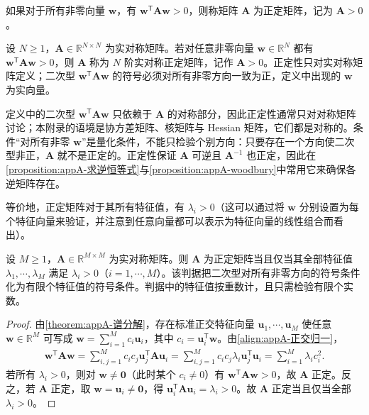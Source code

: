 \documentclass[../main.tex]{subfiles}
\begin{document}
如果对于所有非零向量 $\bm{w}$，有 $\bm{w}^{\mathsf{T}}\bm{A}\bm{w}>0$，则称矩阵 $\bm{A}$ 为正定矩阵，记为 $\bm{A}>0$。

\begin{definition}[正定矩阵]\label{definition:appA-正定矩阵}
设 $N\geqslant1$，$\bm{A}\in\mathbb{R}^{N\times N}$ 为实对称矩阵。若对任意非零向量 $\bm{w}\in\mathbb{R}^{N}$ 都有 $\bm{w}^{\mathsf{T}}\bm{A}\bm{w}>0$，则 $\bm{A}$ 称为 $N$ 阶实对称正定矩阵，记作 $\bm{A}>0$。正定性只对实对称矩阵定义；二次型 $\bm{w}^{\mathsf{T}}\bm{A}\bm{w}$ 的符号必须对所有非零方向一致为正，定义中出现的 $\bm{w}$ 为实向量。
\end{definition}

\begin{remark}
定义中的二次型 $\bm{w}^{\mathsf{T}}\bm{A}\bm{w}$ 只依赖于 $\bm{A}$ 的对称部分，因此正定性通常只对对称矩阵讨论；本附录的语境是协方差矩阵、核矩阵与 Hessian 矩阵，它们都是对称的。条件“对所有非零 $\bm{w}$”是量化条件，不能只检验个别方向：只要存在一个方向使二次型非正，$\bm{A}$ 就不是正定的。正定性保证 $\bm{A}$ 可逆且 $\bm{A}^{-1}$ 也正定，因此在\cref{proposition:appA-求逆恒等式}与\cref{proposition:appA-woodbury}中常用它来确保各逆矩阵存在。
\end{remark}

等价地，正定矩阵对于其所有特征值，有 $\lambda_i>0$（这可以通过将 $\bm{w}$ 分别设置为每个特征向量来验证，并注意到任意向量都可以表示为特征向量的线性组合而看出）。

\begin{proposition}[正定矩阵的特征值判据]\label{proposition:appA-正定判据}
设 $M\geqslant1$，$\bm{A}\in\mathbb{R}^{M\times M}$ 为实对称矩阵。则 $\bm{A}$ 为正定矩阵当且仅当其全部特征值 $\lambda_1,\cdots,\lambda_M$ 满足 $\lambda_i>0$（$i=1,\cdots,M$）。该判据把二次型对所有非零方向的符号条件化为有限个特征值的符号条件。判据中的特征值按重数计，且只需检验有限个实数。
\end{proposition}

\begin{proof}
由\cref{theorem:appA-谱分解}，存在标准正交特征向量 $\bm{u}_1,\cdots,\bm{u}_M$ 使任意 $\bm{w}\in\mathbb{R}^{M}$ 可写成 $\bm{w}=\sum_{i=1}^{M}c_i\bm{u}_i$，其中 $c_i=\bm{u}_i^{\mathsf{T}}\bm{w}$。由\eqref{align:appA-正交归一}，
\begin{align*}
 \bm{w}^{\mathsf{T}}\bm{A}\bm{w}=\sum_{i,j=1}^{M}c_ic_j\bm{u}_j^{\mathsf{T}}\bm{A}\bm{u}_i=\sum_{i,j=1}^{M}c_ic_j\lambda_i\bm{u}_j^{\mathsf{T}}\bm{u}_i=\sum_{i=1}^{M}\lambda_ic_i^{2}.
\end{align*}
若所有 $\lambda_i>0$，则对 $\bm{w}\neq\bm{0}$（此时某个 $c_i\neq0$）有 $\bm{w}^{\mathsf{T}}\bm{A}\bm{w}>0$，故 $\bm{A}$ 正定。反之，若 $\bm{A}$ 正定，取 $\bm{w}=\bm{u}_i\neq\bm{0}$，得 $\bm{u}_i^{\mathsf{T}}\bm{A}\bm{u}_i=\lambda_i>0$。故 $\bm{A}$ 正定当且仅当全部 $\lambda_i>0$。
\end{proof}
\end{document}

